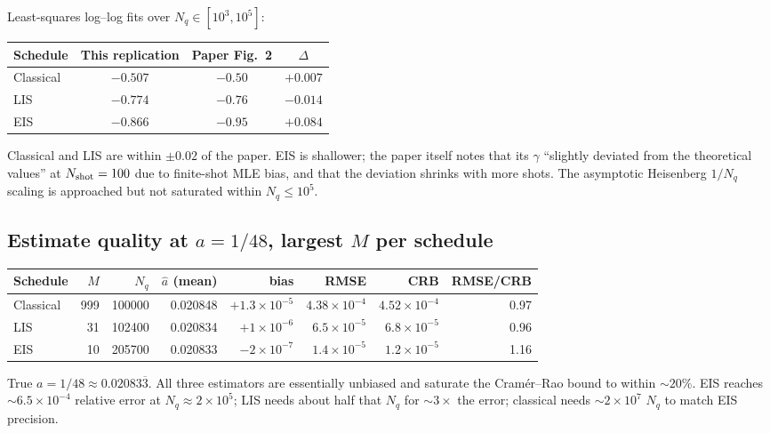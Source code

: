 \documentclass[11pt]{article}
\begin{document}
Least-squares log--log fits over $N_q\in[10^3, 10^5]$:

\begin{center}
\begin{tabular}{lccc}
\toprule
Schedule & This replication & Paper Fig.\ 2 & $\Delta$ \\
\midrule
Classical & $-0.507$ & $-0.50$ & $+0.007$ \\
LIS       & $-0.774$ & $-0.76$ & $-0.014$ \\
EIS       & $-0.866$ & $-0.95$ & $+0.084$ \\
\bottomrule
\end{tabular}
\end{center}

Classical and LIS are within $\pm 0.02$ of the paper. EIS is shallower; the
paper itself notes that its $\gamma$ ``slightly deviated from the theoretical
values'' at $N_{\rm shot}=100$ due to finite-shot MLE bias, and that the
deviation shrinks with more shots. The asymptotic Heisenberg $1/N_q$ scaling
is approached but not saturated within $N_q\leq 10^5$.

\subsection{Estimate quality at $a=1/48$, largest $M$ per schedule}

\begin{center}
\begin{tabular}{lrrrrrrr}
\toprule
Schedule & $M$ & $N_q$ & $\hat a$ (mean) & bias & RMSE & CRB & RMSE/CRB \\
\midrule
Classical & 999 & 100000 & 0.020848 & $+1.3\!\times\!10^{-5}$ & $4.38\!\times\!10^{-4}$ & $4.52\!\times\!10^{-4}$ & 0.97 \\
LIS       &  31 & 102400 & 0.020834 & $+1\!\times\!10^{-6}$   & $6.5\!\times\!10^{-5}$  & $6.8\!\times\!10^{-5}$  & 0.96 \\
EIS       &  10 & 205700 & 0.020833 & $-2\!\times\!10^{-7}$   & $1.4\!\times\!10^{-5}$  & $1.2\!\times\!10^{-5}$  & 1.16 \\
\bottomrule
\end{tabular}
\end{center}

True $a=1/48\approx 0.02083\overline{3}$. All three estimators are essentially
unbiased and saturate the Cram\'er--Rao bound to within $\sim 20\%$. EIS
reaches $\sim 6.5\!\times\!10^{-4}$ relative error at $N_q\approx 2\!\times\!10^5$;
LIS needs about half that $N_q$ for $\sim 3\times$ the error; classical needs
$\sim 2\!\times\!10^7$ $N_q$ to match EIS precision.
\end{document}

